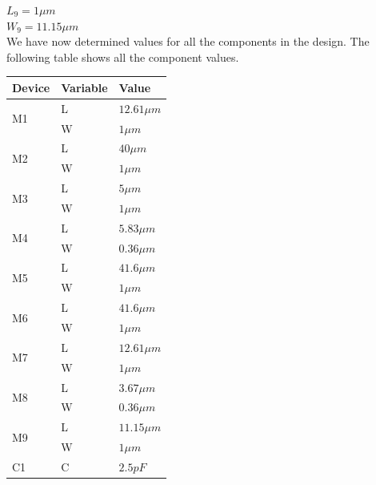 $L_{9} = 1\mu m$ \\
$W_{9} = 11.15\mu m$ \\

We have now determined values for all the components in the design.
The following table shows all the component values.

\begin{table}[h]
	\begin{tabular}{| l | l | l |}
		\hline
		Device			& Variable	& Value		\\
		\hline
		\multirow{2}{*}{M1}	& L		& $12.61\mu m$	\\
					& W		& $1\mu m$	\\
		\hline
		\multirow{2}{*}{M2}	& L		& $40\mu m$	\\
					& W		& $1\mu m$	\\
		\hline
		\multirow{2}{*}{M3}	& L		& $5\mu m$	\\
					& W		& $1\mu m$	\\
		\hline
		\multirow{2}{*}{M4}	& L		& $5.83\mu m$	\\
					& W		& $0.36\mu m$	\\
		\hline
		\multirow{2}{*}{M5}	& L		& $41.6\mu m$	\\
					& W		& $1\mu m$	\\
		\hline
		\multirow{2}{*}{M6}	& L		& $41.6\mu m$	\\
					& W		& $1\mu m$	\\
		\hline
		\multirow{2}{*}{M7}	& L		& $12.61\mu m$	\\
					& W		& $1\mu m$	\\
		\hline
		\multirow{2}{*}{M8}	& L		& $3.67\mu m$	\\
					& W		& $0.36\mu m$	\\
		\hline
		\multirow{2}{*}{M9}	& L		& $11.15\mu m$	\\
					& W		& $1\mu m$	\\
		\hline
		\multirow{1}{*}{C1}	& C		& $2.5pF$	\\
		\hline
	\end{tabular}
\end{table}
